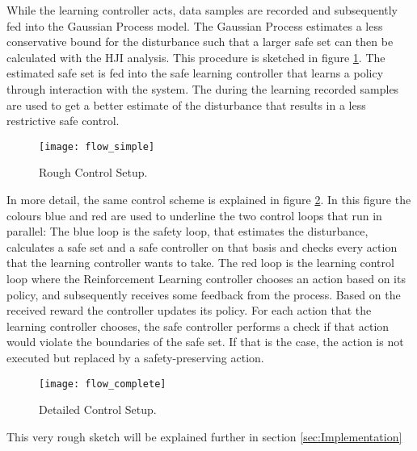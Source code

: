 \documentclass[../main.tex]{subfiles}
\begin{document}
While the learning controller acts, data samples are recorded and subsequently fed into the Gaussian Process model. The Gaussian Process estimates a less conservative bound for the disturbance such that a larger safe set can then be calculated with the HJI analysis. This procedure is sketched in figure \ref{fig:flow_simple}. The estimated safe set is fed into the safe learning controller that learns a policy through interaction with the system. The during the learning recorded samples are used to get a better estimate of the disturbance that results in a less restrictive safe control.
\begin{figure}
    \centering
    \texttt{[image: flow\_simple]}
    \caption{Rough Control Setup.}
    \label{fig:flow_simple}
\end{figure}
In more detail, the same control scheme is explained in figure \ref{fig:flow_complete}. In this figure the colours blue and red are used to underline the two control loops that run in parallel: The blue loop is the safety loop, that estimates the disturbance, calculates a safe set and a safe controller on that basis and checks every action that the learning controller wants to take. The red loop is the learning control loop where the Reinforcement Learning controller chooses an action based on its policy, and subsequently receives some feedback from the process. Based on the received reward the controller updates its policy. For each action that the learning controller chooses, the safe controller performs a check if that action would violate the boundaries of the safe set. If that is the case, the action is not executed but replaced by a safety-preserving action.
\begin{figure}
    \centering
    \texttt{[image: flow\_complete]}
    \caption{Detailed Control Setup.}
    \label{fig:flow_complete}
\end{figure}
This very rough sketch will be explained further in section \ref{sec:Implementation}
\end{document}
